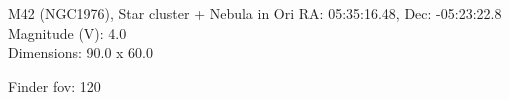 \begin{block}{M42 (NGC1976), Star cluster + Nebula in Ori}
    RA: 05:35:16.48, Dec: -05:23:22.8 \\ 
    Magnitude (V): 4.0 \\ 
    Dimensions: 90.0 x 60.0 

    Finder fov: 120 
\end{block}
